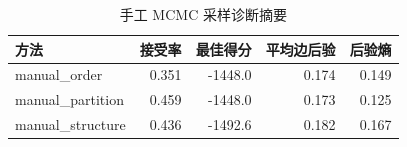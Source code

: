 \begin{table}[H]
\centering
\small
\setlength{\tabcolsep}{2pt}
\caption{手工 MCMC 采样诊断摘要}
\label{tab:manual_diag}
\begin{tabular}{lrrrr}
\toprule
方法 & 接受率 & 最佳得分 & 平均边后验 & 后验熵
\\
\midrule
manual\_order & 0.351 & -1448.0 & 0.174 & 0.149 \\
manual\_partition & 0.459 & -1448.0 & 0.173 & 0.125 \\
manual\_structure & 0.436 & -1492.6 & 0.182 & 0.167 \\
\bottomrule
\end{tabular}
\end{table}
